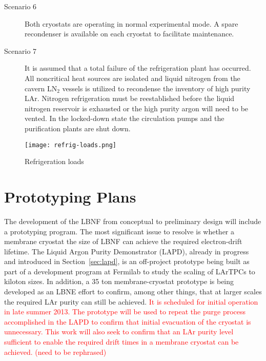 \begin{description}
\item[Scenario 6]
Both cryostats are operating in normal experimental mode. A spare 
recondenser is available on each cryostat to facilitate maintenance.

\item[Scenario 7]
It is assumed that a total failure of the refrigeration plant has 
occurred. All noncritical heat sources are isolated and liquid 
nitrogen from the cavern LN$_2$ vessels is utilized to recondense 
the inventory of high purity LAr. Nitrogen refrigeration must be 
reestablished before the liquid nitrogen reservoir is exhausted 
or the high purity argon will need to be vented. In the locked-down 
state the circulation pumps and the purification plants are shut down.
\end{description}

\begin{figure}[htbp]
\centering
\texttt{[image: refrig-loads.png]}
\caption{Refrigeration loads}
\label{fig:Refrigeration-loads}
\end{figure}

\begin{figure}[htbp]
\centering
\end{figure}


\chapter{Prototyping Plans}
\label{sec:cryo-cryosys-proto-plans}


The development of the LBNF from conceptual to preliminary design 
will include a prototyping program. The most significant issue to 
resolve is whether a membrane cryostat the size of LBNF can 
achieve the required electron-drift lifetime. The Liquid Argon 
Purity Demonstrator (LAPD), already in progress and introduced 
in Section~\ref{sec:lapd}, is an off-project prototype being 
built as part of a development program at Fermilab to study 
the scaling of LArTPCs to kiloton sizes. In addition, a 35 ton 
membrane-cryostat prototype is being developed as an LBNE effort 
to confirm, among other things, that at larger scales the required 
LAr purity can still be achieved. \textcolor{red}{It is scheduled for initial 
operation in late summer 2013. The prototype will be used to 
repeat the purge process accomplished in the LAPD to confirm 
that initial evacuation of the cryostat is unnecessary. This 
work will also seek to confirm that an LAr purity level 
sufficient to enable the required drift times in a membrane 
cryostat can be achieved. (need to be rephrased)}

